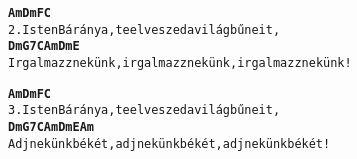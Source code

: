 \begin{minipage}{\textwidth}
\kottastart
{}
\kottaend
\begin{minipage}{\textwidth}
\begin{alltt}
\textbf{   Am          Dm    F                    C}
2. Isten Báránya, te elveszed a világ bűneit,
\textbf{   Dm           G7   C            Am   Dm           E}
   Irgalmazz nekünk, irgalmazz nekünk, irgalmazz nekünk!
\end{alltt}
\vspace{0.0cm}
\versszakspacing
\end{minipage}
\begin{minipage}{\textwidth}
\begin{alltt}
\textbf{   Am          Dm    F                    C}
3. Isten Báránya, te elveszed a világ bűneit,
\textbf{   Dm            G7  C             Am  Dm            E    Am}
   Adj nekünk békét, adj nekünk békét, adj nekünk békét!
\end{alltt}
\vspace{0.0cm}
\versszakspacing
\end{minipage}
\end{minipage}
~\vspace{1.0cm}
\newline
